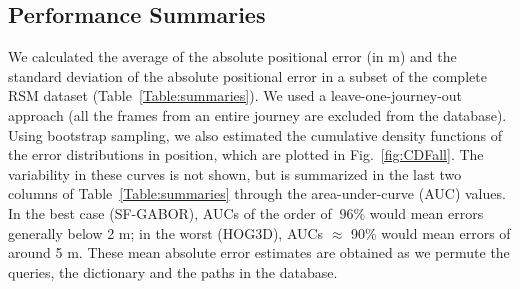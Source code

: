 \subsection{Performance Summaries}
\label{visloc_perf}
We calculated the average of the absolute positional error (in m) and the standard deviation of the absolute positional error in a subset of the complete RSM dataset (Table~\ref{Table:summaries}). We  used a leave-one-journey-out approach (all the frames from an entire journey are excluded from the database).  Using bootstrap sampling, we also estimated the cumulative density functions of the error distributions in position, which are plotted in Fig.~\ref{fig:CDFall}. The variability in these curves is not shown, but is summarized in the last two columns of Table~\ref{Table:summaries} through the area-under-curve (AUC) values. In the best case (SF-GABOR), AUCs of the order of $~96\%$ would mean errors generally below 2 m; in the worst (HOG3D), AUCs $\approx$ 90\% would mean errors of around 5 m.  These  mean absolute error estimates are obtained as we permute the queries, the dictionary and the paths in the database. 


